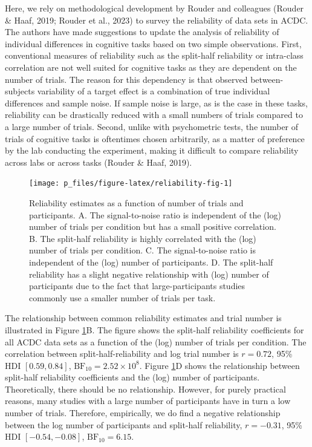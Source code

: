 \documentclass[
  man,floatsintext]{apa6}
\begin{document}
Here, we rely on methodological development by Rouder and colleagues (Rouder \& Haaf, 2019; Rouder et al., 2023) to survey the reliability of data sets in ACDC. The authors have made suggestions to update the analysis of reliability of individual differences in cognitive tasks based on two simple observations. First, conventional measures of reliability such as the split-half reliability or intra-class correlation are not well suited for cognitive tasks as they are dependent on the number of trials. The reason for this dependency is that observed between-subjects variability of a target effect is a combination of true individual differences and sample noise. If sample noise is large, as is the case in these tasks, reliability can be drastically reduced with a small numbers of trials compared to a large number of trials. Second, unlike with psychometric tests, the number of trials of cognitive tasks is oftentimes chosen arbitrarily, as a matter of preference by the lab conducting the experiment, making it difficult to compare reliability across labs or across tasks (Rouder \& Haaf, 2019).



\begin{figure}

{\centering \texttt{[image: p\_files/figure-latex/reliability-fig-1]} 

}

\caption{Reliability estimates as a function of number of trials and participants. A. The signal-to-noise ratio is independent of the (log) number of trials per condition but has a small positive correlation. B. The split-half reliability is highly correlated with the (log) number of trials per condition. C. The signal-to-noise ratio is independent of the (log) number of participants. D. The split-half reliability has a slight negative relationship with (log) number of participants due to the fact that large-participants studies commonly use a smaller number of trials per task.}\label{fig:reliability-fig}
\end{figure}

The relationship between common reliability estimates and trial number is illustrated in Figure \ref{fig:reliability-fig}B. The figure shows the split-half reliability coefficients for all ACDC data sets as a function of the (log) number of trials per condition. The correlation between split-half-reliability and log trial number is \(r = 0.72\), 95\% HDI \([0.59, 0.84]\), \(\mathrm{BF}_{\textrm{10}} = 2.52 \times 10^{8}\). Figure \ref{fig:reliability-fig}D shows the relationship between split-half reliability coefficients and the (log) number of participants. Theoretically, there should be no relationship. However, for purely practical reasons, many studies with a large number of participants have in turn a low number of trials. Therefore, empirically, we do find a negative relationship between the log number of participants and split-half reliability, \(r = -0.31\), 95\% HDI \([-0.54, -0.08]\), \(\mathrm{BF}_{\textrm{10}} = 6.15\).
\end{document}
